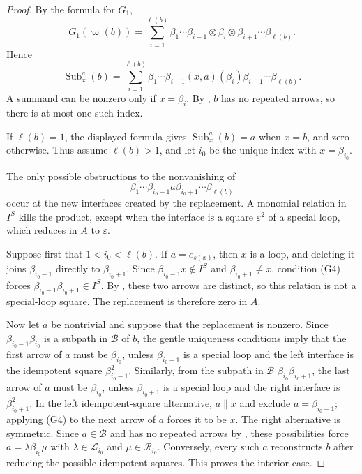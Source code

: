 \documentclass[11pt,a4paper,reqno]{amsart}
\newcommand{\mB}{\mathcal B}
\newcommand{\mL}{\mathcal L}
\newcommand{\mR}{\mathcal R}
\newcommand{\Sub}{\operatorname{Sub}}
\newcommand{\para}[2]{(#1,#2)}
\newcommand{\bet}{\beta_{\ell(b)}}
\theoremstyle{plain}
\theoremstyle{definition}
\numberwithin{equation}{section}
\begin{document}
	\begin{proof}
		By the formula for $G_1$,
		\[
		G_1(\varpi(b))
		=
		\sum_{i=1}^{\ell(b)}
		\beta_1\cdots\beta_{i-1}\otimes \beta_i
		\otimes \beta_{i+1}\cdots\bet.
		\]
		Hence
		\[
		\Sub_x^a(b)
		=
		\sum_{i=1}^{\ell(b)}
		\beta_1\cdots\beta_{i-1} \para{x}{a}(\beta_i)
		\beta_{i+1}\cdots\bet.
		\]
		A summand can be nonzero only if $x=\beta_i$.  By ,
		$b$ has no repeated arrows, so there is at most one such index.
		
		If $\ell(b)=1$, the displayed formula gives $\Sub_x^a(b)=a$ when
		$x=b$, and zero otherwise.  Thus assume $\ell(b)>1$, and let $i_0$ be
		the unique index with $x=\beta_{i_0}$.
		
		The only possible obstructions to the nonvanishing of
		\[
		\beta_1\cdots\beta_{i_0-1} a
		\beta_{i_0+1}\cdots\bet
		\]
		occur at the new interfaces created by the replacement.
		A monomial relation in $I^S$ kills the product, except when the interface
		is a square $\varepsilon^2$ of a special loop, which reduces in $A$ to
		$\varepsilon$.
		
		Suppose first that $1<i_0<\ell(b)$.  If $a=e_{s(x)}$, then $x$ is a
		loop, and deleting it joins $\beta_{i_0-1}$ directly to $\beta_{i_0+1}$.
		Since $\beta_{i_0-1}x\notin I^S$ and $\beta_{i_0+1}\neq x$,
		condition \textup{(G4)} forces
		$\beta_{i_0-1}\beta_{i_0+1}\in I^S$.
		By , these two arrows are distinct, so this relation
		is not a special-loop square.  The replacement is therefore zero in $A$.
		
		Now let $a$ be nontrivial and suppose that the replacement is nonzero.
		Since $\beta_{i_0-1}\beta_{i_0}$ is a subpath in $\mB$ of $b$, the gentle
		uniqueness conditions imply that the first arrow of $a$ must be
		$\beta_{i_0}$, unless $\beta_{i_0-1}$ is a special loop and the left
		interface is the idempotent square $\beta_{i_0-1}^2$.  Similarly, from
		the subpath in $\mB$ $\beta_{i_0}\beta_{i_0+1}$, the last arrow of $a$
		must be $\beta_{i_0}$, unless $\beta_{i_0+1}$ is a special loop and the
		right interface is $\beta_{i_0+1}^2$.
		In the left idempotent-square alternative, $a\parallel x$ and
		 exclude $a=\beta_{i_0-1}$; applying
		\textup{(G4)} to the next arrow of $a$ forces it to be $x$.
		The right alternative is symmetric.
		Since $a\in\mB$ and has no repeated arrows by ,
		these possibilities force $a=\lambda\beta_{i_0}\mu$
		with $\lambda\in\mL_{i_0}$ and $\mu\in\mR_{i_0}$.  Conversely, every
		such $a$ reconstructs $b$ after reducing the possible idempotent squares.
		This proves the interior case.
		

\end{proof}
\end{document}
